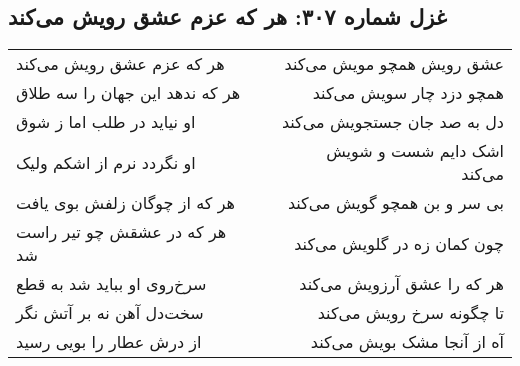 \begin{center}
\section*{غزل شماره ۳۰۷: هر که عزم عشق رویش می‌کند}
\label{sec:307}
\begin{longtable}{l p{0.5cm} r}
هر که عزم عشق رویش می‌کند
&&
عشق رویش همچو مویش می‌کند
\\
هر که ندهد این جهان را سه طلاق
&&
همچو دزد چار سویش می‌کند
\\
او نیاید در طلب اما ز شوق
&&
دل به صد جان جستجویش می‌کند
\\
او نگردد نرم از اشکم ولیک
&&
اشک دایم شست و شویش می‌کند
\\
هر که از چوگان زلفش بوی یافت
&&
بی سر و بن همچو گویش می‌کند
\\
هر که در عشقش چو تیر راست شد
&&
چون کمان زه در گلویش می‌کند
\\
سرخ‌روی او بباید شد به قطع
&&
هر که را عشق آرزویش می‌کند
\\
سخت‌دل آهن نه بر آتش نگر
&&
تا چگونه سرخ رویش می‌کند
\\
از درش عطار را بویی رسید
&&
آه از آنجا مشک بویش می‌کند
\\
\end{longtable}
\end{center}
